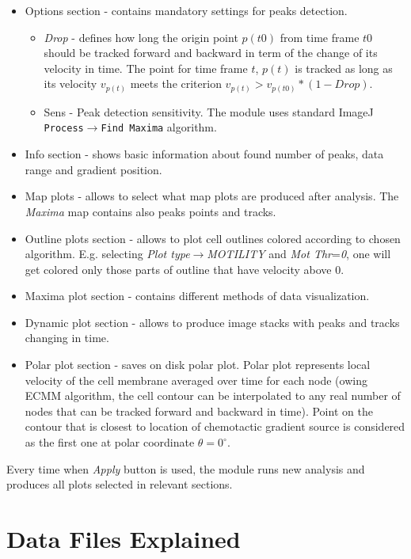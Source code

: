 \documentclass[a4paper,12pt]{article}
\begin{document}
\begin{itemize}
	\item Options section - contains mandatory settings for peaks detection.
	\begin{itemize}
		\item \textit{Drop} - defines how long the origin point $p(t0)$ from time frame $t0$ should be tracked forward and backward in term of the change of its velocity in time. The point for time frame $t$, $p(t)$ is tracked as long as its velocity $v_{p(t)}$ meets the criterion $v_{p(t)}>v_{p(t0)}*(1-Drop)$.
		\item Sens - Peak detection sensitivity. The module uses standard ImageJ \texttt{Process$\rightarrow$Find Maxima} algorithm.
	\end{itemize} 
	\item Info section - shows basic information about found number of peaks, data range and gradient position.
	\item Map plots - allows to select what map plots are produced after analysis. The \textit{Maxima} map contains also peaks points and tracks.  
	\item Outline plots section - allows to plot cell outlines colored according to chosen algorithm. E.g. selecting \textit{Plot type}$\rightarrow$\textit{MOTILITY} and \textit{Mot Thr}=\textit{0}, one will get colored only those parts of outline that have velocity above 0.
	\item Maxima plot section - contains different methods of data visualization.
	\item Dynamic plot section - allows to produce image stacks with peaks and tracks changing in time.
	\item Polar plot section - saves on disk polar plot. Polar plot represents local velocity of the cell membrane averaged over time for each node (owing ECMM algorithm, the cell contour can be interpolated to any real number of nodes that can be tracked forward and backward in time). Point on the contour that is closest to location of chemotactic gradient source is considered as the first one at polar coordinate $\theta=0^{\circ}$.
\end{itemize}
  
Every time when \textit{Apply} button is used, the module runs new analysis and produces all plots selected in relevant sections.  

\section{Data Files Explained}
\label{sec:DataFilesExplained}
\end{document}
